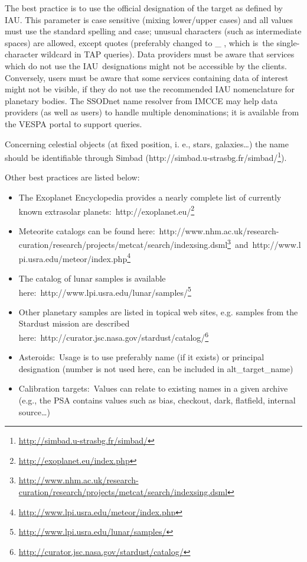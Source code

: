 \documentclass[11pt,a4paper]{ivoa}
\begin{document}
The best practice is to use the official designation of the target as defined by IAU. This parameter is case sensitive (mixing lower/upper cases) and all values must use the standard spelling and case; unusual characters (such as intermediate spaces) are allowed, except quotes (preferably changed to \_ , which is the single-character wildcard in TAP queries). Data providers must be aware that services which do not use the IAU designations might not be accessible by the clients. Conversely, users must be aware that some services containing data of interest might not be visible, if they do not use the recommended IAU nomenclature for planetary bodies. The SSODnet name resolver from IMCCE may help data providers (as well as users) to handle multiple denominations; it is available from the VESPA portal to support queries.

Concerning celestial objects (at fixed position, i. e., stars, galaxies…) the name should be identifiable through Simbad (http://simbad.u-strasbg.fr/simbad/\footnote{\url{http://simbad.u-strasbg.fr/simbad/}}).

Other best practices are listed below:

\begin{itemize}
\item The Exoplanet Encyclopedia provides a nearly complete list of currently known extrasolar planets: http://exoplanet.eu/\footnote{\url{http://exoplanet.eu/index.php}}
\item Meteorite catalogs can be found here: http://www.nhm.ac.uk/research-curation/research/projects/metcat/search/indexsing.dsml\footnote{\url{http://www.nhm.ac.uk/research-curation/research/projects/metcat/search/indexsing.dsml}} and http://www.lpi.usra.edu/meteor/index.php\footnote{\url{http://www.lpi.usra.edu/meteor/index.php}}
\item The catalog of lunar samples is available here: http://www.lpi.usra.edu/lunar/samples/\footnote{\url{http://www.lpi.usra.edu/lunar/samples/}}
\item Other planetary samples are listed in topical web sites, e.g. samples from the Stardust mission are described here: http://curator.jsc.nasa.gov/stardust/catalog/\footnote{\url{http://curator.jsc.nasa.gov/stardust/catalog/}}
\item Asteroids: Usage is to use preferably name (if it exists) or principal designation (number is not used here, can be included in alt\_target\_name)
\item Calibration targets: Values can relate to existing names in a given archive (e.g., the PSA contains values such as bias, checkout, dark, flatfield, internal source…)
\end{itemize}
\end{document}
